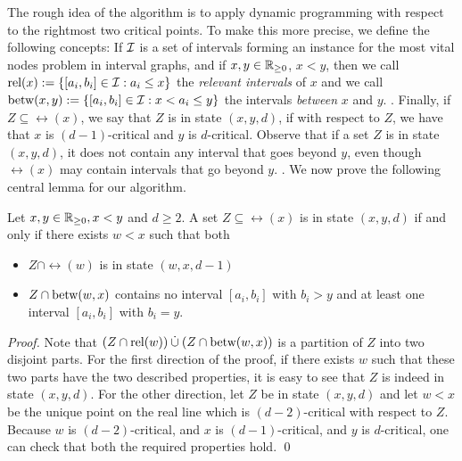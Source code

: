 The rough idea of the algorithm is to apply dynamic programming with respect to the rightmost two critical points. To make this more precise, we define the following concepts: If $\mathcal{I}$ is a set of intervals forming an instance for the most vital nodes problem in interval graphs, and if $x, y \in \mathbb{R}_{\geq 0}$, $x < y$, then we call $\operatorname{\text{rel}}(x) := \{ [a_i, b_i] \in \mathcal{I} : a_i \leq x \}$ the \emph{relevant intervals} of $x$ and we call $\operatorname{\text{betw}}(x, y) := \{ [a_i, b_i] \in \mathcal{I} : x < a_i \leq y \}$ the intervals \emph{between} $x$ and $y$. 
. 
Finally, if $Z \subseteq \rel(x)$, we say that $Z$ is in state $(x, y, d)$, if with respect to $Z$, we have that $x$ is $(d-1)$-critical and $y$ is $d$-critical. 
Observe that if a set $Z$ is in state $(x, y, d)$, it does not contain any interval that goes beyond $y$, even though $\rel(x)$ may contain intervals that go beyond $y$. 
. We now prove the following central lemma for our algorithm.

\begin{lemma}
\label{lemma:shortest_path_bellmann_principle}
Let $x, y \in \mathbb{R}_{\geq 0}, x < y$ and $d \geq 2$. A set $Z \subseteq \rel(x)$ is in state $(x, y, d)$ if and only if there exists $w < x$ such that both 
\begin{itemize}
\item $Z \cap \rel(w)$ is in state $(w, x, d-1)$
\item $Z \cap \operatorname{\text{betw}}(w, x)$ contains no interval $[a_i, b_i]$ with $b_i > y$ and at least one interval $[a_i, b_i]$ with $b_i = y$.
\end{itemize} 
\end{lemma}
\begin{proof}
Note that $(Z \cap \operatorname{\text{rel}}(w)) \mathbin{\dot{\cup}} (Z \cap \operatorname{\text{betw}}(w, x))$ is a partition of $Z$ into two disjoint parts. For the first direction of the proof, if there exists $w$ such that these two parts have the two described properties, it is easy to see that $Z$ is indeed in state $(x, y, d)$. For the other direction, let $Z$ be in state $(x, y, d)$ and let $w < x$ be the unique point on the real line which is $(d-2)$-critical with respect to $Z$. Because $w$ is $(d-2)$-critical, and $x$ is $(d-1)$-critical, and $y$ is $d$-critical, one can check that both the required properties hold.
\qed\end{proof}

